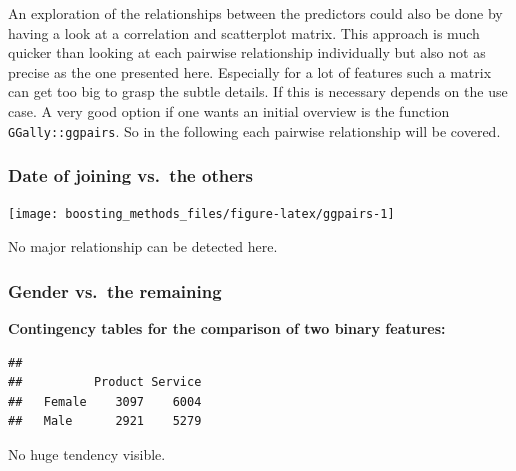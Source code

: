 \documentclass[
]{book}
\newenvironment{Shaded}{\begin{snugshade}}{\end{snugshade}}
\newcommand{\CommentTok}[1]{\textcolor[rgb]{0.56,0.35,0.01}{\textit{#1}}}
\newcommand{\FunctionTok}[1]{\textcolor[rgb]{0.00,0.00,0.00}{#1}}
\newcommand{\NormalTok}[1]{#1}
\newcommand{\SpecialCharTok}[1]{\textcolor[rgb]{0.00,0.00,0.00}{#1}}
\begin{document}
An exploration of the relationships between the predictors could also be done by having a look at a correlation and scatterplot matrix. This approach is much quicker than looking at each pairwise relationship individually but also not as precise as the one presented here. Especially for a lot of features such a matrix can get too big to grasp the subtle details. If this is necessary depends on the use case. A very good option if one wants an initial overview is the function \texttt{GGally::ggpairs}. So in the following each pairwise relationship will be covered.

\hypertarget{date-of-joining-vs.-the-others}{%
\subsubsection{Date of joining vs.~the others}\label{date-of-joining-vs.-the-others}}

\texttt{[image: boosting\_methods\_files/figure-latex/ggpairs-1]}

No major relationship can be detected here.

\hypertarget{gender-vs.-the-remaining}{%
\subsubsection{Gender vs.~the remaining}\label{gender-vs.-the-remaining}}

\textbf{Contingency tables for the comparison of two binary features:}

\begin{Shaded}
\end{Shaded}

\begin{verbatim}
##         
##          Product Service
##   Female    3097    6004
##   Male      2921    5279
\end{verbatim}

No huge tendency visible.

\begin{Shaded}
\end{Shaded}
\end{document}

